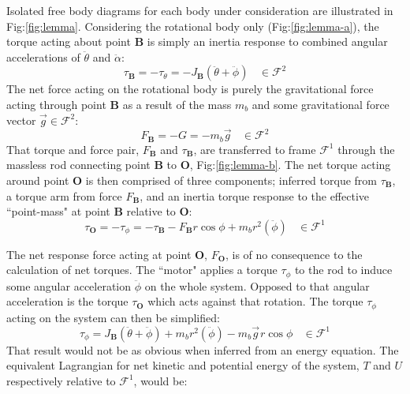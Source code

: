 \par
Isolated free body diagrams for each body under consideration are illustrated in Fig:\ref{fig:lemma}. Considering the rotational body only (Fig:\ref{fig:lemma-a}), the torque acting about point $\mathbf{B}$ is simply an inertia response to combined angular accelerations of $\ddot{\theta}$ and $\ddot{\alpha}$:
\begin{equation}
\tau_\mathbf{B}=-\tau_\theta=-J_\mathbf{B}(\ddot{\theta}+\ddot{\phi})~~~~\in\mathcal{F}^2
\end{equation}
The net force acting on the rotational body is purely the gravitational force acting through point $\mathbf{B}$ as a result of the mass $m_b$ and some gravitational force vector $\vec{g}\in\mathcal{F}^2$:
\begin{equation}
F_\mathbf{B}=-G=-m_b\vec{g}~~~~\in\mathcal{F}^2
\end{equation}
That torque and force pair, $F_\mathbf{B}$ and $\tau_\mathbf{B}$, are transferred to frame $\mathcal{F}^1$ through the massless rod connecting point $\mathbf{B}$ to $\mathbf{O}$, Fig:\ref{fig:lemma-b}. The net torque acting around point $\mathbf{O}$ is then comprised of three components; inferred torque from $\tau_\mathbf{B}$, a torque arm from force $F_\mathbf{B}$, and an inertia torque response to the effective ``point-mass" at point $\mathbf{B}$ relative to $\mathbf{O}$:
\begin{equation}
\tau_\mathbf{O}=-\tau_\phi=-\tau_\mathbf{B}-F_\mathbf{B}r\cos{\phi}+m_br^2(\ddot{\phi})~~~~\in\mathcal{F}^1
\end{equation}
\par
The net response force acting at point $\mathbf{O}$, $F_\mathbf{O}$, is of no consequence to the calculation of net torques. The ``motor" applies a torque $\tau_\phi$ to the rod to induce some angular acceleration $\ddot{\phi}$ on the whole system. Opposed to that angular acceleration is the torque $\tau_\mathbf{O}$ which acts against that rotation. The torque $\tau_\phi$ acting on the system can then be simplified:
\begin{equation}
\tau_\phi=J_\mathbf{B}(\ddot{\theta}+\ddot{\phi})+m_br^2(\ddot{\phi})-m_b\vec{g}\hspace{1pt}r\cos\phi~~~~\in\mathcal{F}^1
\end{equation}
That result would not be as obvious when inferred from an energy equation. The equivalent Lagrangian for net kinetic and potential energy of the system, $T$ and $U$ respectively relative to $\mathcal{F}^1$, would be:
